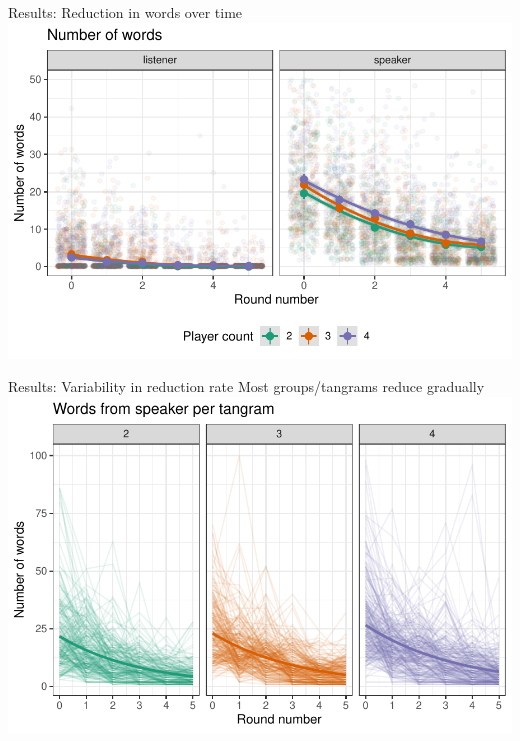 \documentclass[ 12pt, xcolor=beamer,table,usenames,dvipsnames, ignorenonframetext, ngerman]{beamer}
\begin{document}
\begin{frame}{\large Results: Reduction in words over time}
	\includegraphics[width=\textwidth]{../images/words.pdf}

\end{frame}

\begin{frame}{\large Results: Variability in reduction rate}
	Most groups/tangrams reduce gradually
	\includegraphics[width=\textwidth]{../images/words_lines.pdf}
\end{frame}
\end{document}
